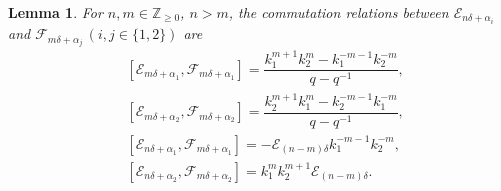 \documentclass[12pt]{amsart}
\newtheorem{lemma}[theorem]{Lemma}
\numberwithin{equation}{section}
\numberwithin{equation}{section}
\begin{document}
\begin{lemma} 
For $n,m\in\mathbb{Z}_{\ge 0}$, $n>m$, the commutation relations between $\mathcal{E}_{n\delta+\alpha_i}$ and $\mathcal{F}_{m\delta+\alpha_j}\,(i,j\in\{1,2\})$ are 
\begin{align}  
&[\mathcal{E}_{m\delta+\alpha_1},\mathcal{F}_{m\delta+\alpha_1}]=\dfrac{k^{m+1}_1k^m_2- k^{-m-1}_1k^{-m}_2}{q - q^{-1}},\\ &[\mathcal{E}_{m\delta+\alpha_2},\mathcal{F}_{m\delta+\alpha_2}]=\dfrac{k^{m+1}_2k^m_1- k^{-m-1}_2k^{-m}_1}{q - q^{-1}},\\
&[\mathcal{E}_{n\delta+\alpha_1},\mathcal{F}_{m\delta+\alpha_1}] =-\mathcal{E}_{(n-m)\delta}k^{-m-1}_1k^{-m}_2,\\
&[\mathcal{E}_{n\delta+\alpha_2},\mathcal{F}_{m\delta+\alpha_2}] =k^{m}_1k^{m+1}_2\mathcal{E}_{(n-m)\delta}.
\end{align}  
\end{lemma} 
\end{document}
